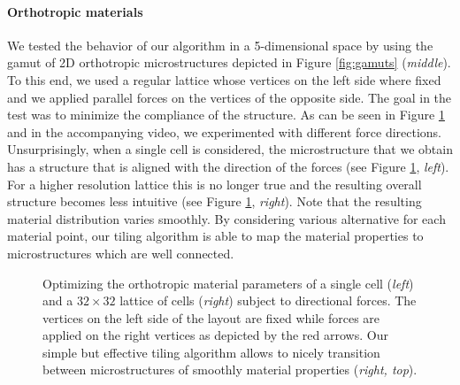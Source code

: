 \paragraph{Orthotropic materials}
We tested the behavior of our algorithm in a 5-dimensional space by using the gamut of 2D orthotropic microstructures depicted in Figure \ref{fig:gamuts} (\emph{middle}). To this end, we used a regular lattice whose vertices on the left side where fixed and we applied parallel forces on the vertices of the opposite side. The goal in the test was to minimize the compliance of the structure. As can be seen in Figure \ref{plot:res} and in the accompanying video, we experimented with different force directions. Unsurprisingly, when a single cell is considered, the microstructure that we obtain has a structure that is aligned with the direction of the forces (see Figure \ref{plot:res}, \emph{left}). 
For a higher resolution lattice this is no longer true and the resulting overall structure becomes less intuitive (see Figure \ref{plot:res}, \emph{right}). 
Note that the resulting material distribution varies smoothly. By considering various alternative for each material point, our tiling algorithm is able to map the material properties to microstructures which are well connected. 

\begin{figure}
	\centering
	\caption{Optimizing the orthotropic material parameters of a single cell (\emph{left}) and a $32\times32$ lattice of cells (\emph{right}) subject to directional forces. The vertices on the left side of the layout are fixed while forces are applied on the right vertices as depicted by the red arrows. Our simple but effective tiling algorithm allows to nicely transition between microstructures of smoothly material properties (\emph{right, top}).}
	\label{plot:res}
\end{figure}

